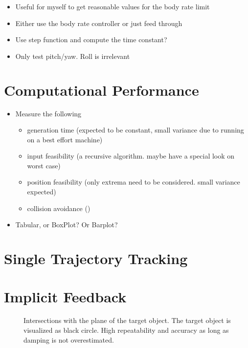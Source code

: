 \begin{itemize}
	\color{red}
	\item Useful for myself to get reasonable values for the body rate limit
	\item Either use the body rate controller or just feed through
	\item Use step function and compute the time constant?
	\item Only test pitch/yaw. Roll is irrelevant
\end{itemize}

\section{Computational Performance}

\begin{itemize}
	\color{red}
	\item Measure the following
	\begin{itemize}
		\item generation time (expected to be constant, small variance due to running on a best effort machine)
		\item input feasibility (a recursive algorithm. maybe have a special look on worst case)
		\item position feasibility (only extrema need to be considered. small variance expected)
		\item collision avoidance ()
	\end{itemize}
	\item Tabular, or BoxPlot? Or Barplot? 
\end{itemize}

\section{Single Trajectory Tracking}


\section{Implicit Feedback}






\begin{figure}
	\centering
	
	\caption{Intersections with the plane of the target object. The target object is visualized as black circle. High repeatability and accuracy as long as damping is not overestimated.}
\end{figure}


